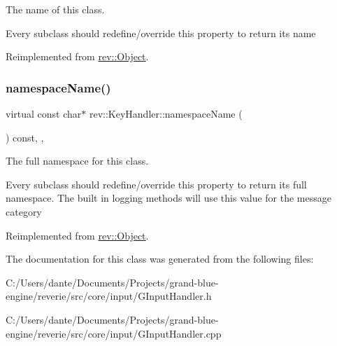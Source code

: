 The name of this class. 

Every subclass should redefine/override this property to return its name 

Reimplemented from \mbox{\hyperlink{classrev_1_1_object_a7a2013f91169479b65cf93afdc5d9a68}{rev\+::\+Object}}.

\mbox{\label{classrev_1_1_key_handler_aa60d20ac34cf06508ce06102491a13ce}} 
\subsubsection{\texorpdfstring{namespaceName()}{namespaceName()}}
{\footnotesize\ttfamily virtual const char$\ast$ rev\+::\+Key\+Handler\+::namespace\+Name (\begin{DoxyParamCaption}{ }\end{DoxyParamCaption}) const\hspace{0.3cm}{\ttfamily [inline]}, {\ttfamily [override]}, {\ttfamily [virtual]}}



The full namespace for this class. 

Every subclass should redefine/override this property to return its full namespace. The built in logging methods will use this value for the message category 

Reimplemented from \mbox{\hyperlink{classrev_1_1_object_aaeb638d3e10f361c56c211a318a27f3d}{rev\+::\+Object}}.



The documentation for this class was generated from the following files\+:\begin{DoxyCompactItemize}
\item 
C\+:/\+Users/dante/\+Documents/\+Projects/grand-\/blue-\/engine/reverie/src/core/input/G\+Input\+Handler.\+h\item 
C\+:/\+Users/dante/\+Documents/\+Projects/grand-\/blue-\/engine/reverie/src/core/input/G\+Input\+Handler.\+cpp\end{DoxyCompactItemize}
